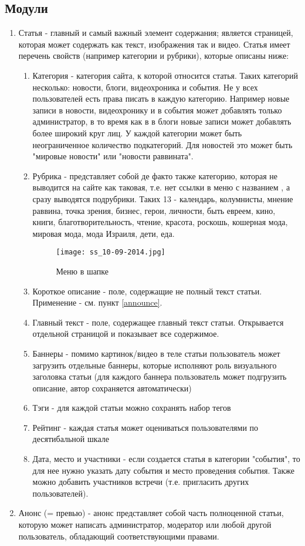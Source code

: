 \documentclass[12pt]{article} %
\begin{document}
\subsection{Модули}


\begin{enumerate}
\item Статья - главный и самый важный элемент содержания; является страницей, которая может содержать как текст, изображения так и видео. Статья имеет перечень свойств (например категории и рубрики), которые описаны ниже:
    \begin{enumerate}
    \item{Категория} - категория сайта, к которой относится статья. Таких категорий несколько: новости, блоги, видеохроника и события. Не у всех пользователей есть права писать в каждую категорию. Например новые записи в новости, видеохронику и в события может добавлять только администратор, в то время как в в блоги новые записи может добавлять более широкий круг лиц. У каждой категории может быть неограниченное количество \label{subcategory} подкатегорий. Для новостей это может быть "мировые новости" или "новости раввината".
    \item{Рубрика} - представляет собой де факто также категорию, которая не выводится на сайте как таковая, т.е. нет ссылки в меню с названием , а сразу выводятся подрубрики. Таких 13 - календарь, колумнисты, мнение раввина, точка зрения, бизнес, герои, личности, быть евреем, кино, книги, благотворительность, чтение, красота, роскошь, кошерная мода, мировая мода, мода Израиля, дети, еда.
        \begin{figure}[ht!]
        \centering
        \texttt{[image: ss\_10-09-2014.jpg]}
        \caption{Меню в шапке \label{overflow}}
        \end{figure}
    \item{Короткое описание} - поле, содержащие не полный текст статьи. Применение - см. пункт \ref{announce}.
    \item{Главный текст} - поле, содержащее главный текст статьи. Открывается отдельной страницой и показывает все содержимое.
    \item{Баннеры} - помимо картинок/видео в теле статьи пользователь может загрузить отдельные баннеры, которые исполняют роль визуального заголовка статьи (для каждого баннера пользователь может подгрузить описание, автор сохраняется автоматически)
    \item{Тэги} - для каждой статьи можно сохранять набор тегов
    \item{Рейтинг} - каждая статья может оцениваться пользователями по десятибальной шкале
    \item{Дата, место и участники} - если создается статья в категории "события", то для нее нужно указать дату события и место проведения события. Также можно добавить участников встречи (т.е. пригласить других пользователей). 
    \end{enumerate}
\item \label{announce}{Анонс} (= превью) - анонс представляет собой часть полноценной статьи, которую может написать администратор, модератор или любой другой пользователь, обладающий соответствующими правами.


\end{enumerate}
\end{document}
